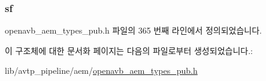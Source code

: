 \subsubsection[{\texorpdfstring{sf}{sf}}]{ sf}\hypertarget{structopenavb__aem__stream__format__iec__61883__6__t_a153db177c2b7653917dff143e5f755e1}{}\label{structopenavb__aem__stream__format__iec__61883__6__t_a153db177c2b7653917dff143e5f755e1}


openavb\+\_\+aem\+\_\+types\+\_\+pub.\+h 파일의 365 번째 라인에서 정의되었습니다.



이 구조체에 대한 문서화 페이지는 다음의 파일로부터 생성되었습니다.\+:\begin{DoxyCompactItemize}
\item 
lib/avtp\+\_\+pipeline/aem/\hyperlink{openavb__aem__types__pub_8h}{openavb\+\_\+aem\+\_\+types\+\_\+pub.\+h}\end{DoxyCompactItemize}
